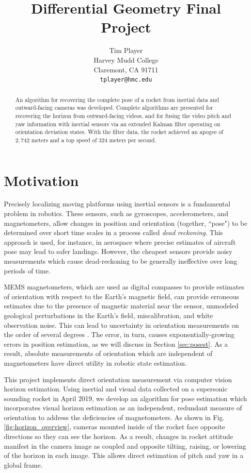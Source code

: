 \documentclass{article}
\title{Differential Geometry Final Project}
\author{%
 Tim Player \\
  Harvey Mudd College\\
  Claremont, CA 91711 \\
  \texttt{tplayer@hmc.edu} \\
}
\begin{document}
\maketitle

\begin{abstract}
    An algorithm for recovering the complete pose of a rocket from inertial data and outward-facing cameras was developed. Complete algorithms are presented for recovering the horizon from outward-facing videos, and for fusing the video pitch and yaw information with inertial sensors via an extended Kalman filter operating on orientation deviation states. With the filter data, the rocket achieved an apogee of $2,742$ meters and a top speed of  $324$ meters per second.
\end{abstract}

\section{Motivation}
Precisely localizing moving platforms using inertial sensors is a fundamental problem in robotics. These sensors, such as gyroscopes, accelerometers, and magnetometers, allow changes in position and orientation (together, ``pose") to be determined over short time scales in a process called \textit{dead reckoning}. This approach is used, for instance, in aerospace where precise estimates of aircraft pose may lead to safer landings. However, the cheapest sensors provide noisy measurements which cause dead-reckoning to be generally ineffective over long periods of time. 

MEMS magnetometers, which are used as digital compasses to provide estimates of orientation with respect to the Earth's magnetic field, can provide erroneous estimates due to the presence of magnetic material near the sensor, unmodeled geological perturbations in the Earth's field, miscalibration, and white observation noise. This can lead to uncertainty in orientation measurements on the order of several degrees \cite{introtoiner}. The error, in turn, causes exponentially-growing errors in position estimation, as we will discuss in Section \ref{sec:posest}. As a result, absolute measurements of orientation which are independent of magnetometers have direct utility in robotic state estimation.

This project implements direct orientation measurement via computer vision horizon estimation. Using inertial and visual data collected on a supersonic sounding rocket in April 2019, we develop an algorithm for pose estimation which incorporates visual horizon estimation as an independent, redundant measure of orientation to address the deficiencies of magnetometers. As shown in Fig. \ref{fig:horizon_overview}, cameras mounted inside of the rocket face opposite directions so they can see the horizon. As a result, changes in rocket attitude manifest in the camera image as coupled and opposite tilting, raising, or lowering of the horizon in each image. This allows direct estimation of pitch and yaw in a global frame.
\end{document}
